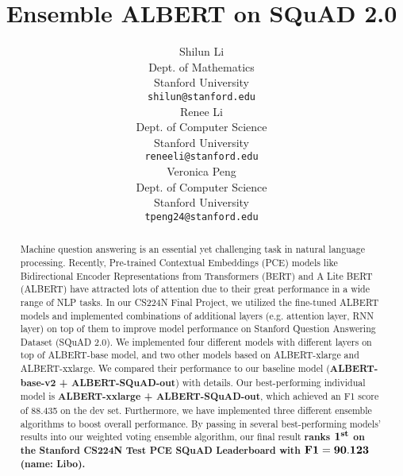\documentclass{article}
\title{
 Ensemble ALBERT on SQuAD 2.0\\
}
\author{
  Shilun Li \\
  Dept. of Mathematics \\
  Stanford University \\
  \texttt{shilun@stanford.edu} \\
  \And
  Renee Li \\
  Dept. of Computer Science \\
  Stanford University \\
  \texttt{reneeli@stanford.edu}\\
  \And
  Veronica Peng \\
  Dept. of Computer Science \\
  Stanford University \\
  \texttt{tpeng24@stanford.edu}
}
\begin{document}
\maketitle
\begin{abstract}
Machine question answering is an essential yet challenging task in natural language processing. Recently, Pre-trained Contextual Embeddings (PCE) models like Bidirectional Encoder Representations from Transformers (BERT) and A Lite BERT (ALBERT) have attracted lots of attention due to their great performance in a wide range of NLP tasks. In our CS224N Final Project, we utilized the fine-tuned ALBERT models and implemented combinations of additional layers (e.g. attention layer, RNN layer) on top of them to improve model performance on Stanford Question Answering Dataset (SQuAD 2.0). We implemented four different models with different layers on top of ALBERT-base model, and two other models based on ALBERT-xlarge and ALBERT-xxlarge. We compared their performance to our baseline model (\textbf{ALBERT-base-v2 + ALBERT-SQuAD-out}) with details. Our best-performing individual model is \textbf{ALBERT-xxlarge + ALBERT-SQuAD-out}, which achieved an F1 score of 88.435 on the dev set. Furthermore, we have implemented three different ensemble algorithms to boost overall performance. By passing in several best-performing models' results into our weighted voting ensemble algorithm, our final result \textbf{ranks $\bold{1^{st}}$ on the Stanford CS224N Test PCE SQuAD Leaderboard with $\bold{F1 = 90.123}$ (name: Libo).}

\end{abstract}
\end{document}
